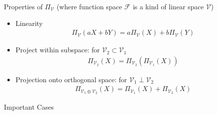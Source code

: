\begin{point}
    Properties of $ \Pi_{\mathcal{V}} $ (where function space $ \mathscr{F} $ is a kind of linear space $ \mathcal{V} $)
\end{point}
\begin{itemize}[topsep=2pt,itemsep=0pt]
    \item Linearity
    \begin{align*}
        \Pi_{\mathcal{V}}(aX+bY)=a\Pi_{\mathcal{V}}(X)+b\Pi_{\mathcal{V}}(Y)
    \end{align*}
    \item Project within subspace: for $\mathcal{V}_2\subset \mathcal{V}_1 $
    \begin{align*}
        \Pi_{\mathcal{V}_2}(X)=\Pi_{\mathcal{V}_2}\left(\Pi_{\mathcal{V}_1}(X)\right) 
    \end{align*}
    \item Projection onto orthogonal space: for $ \mathcal{V}_1\perp\mathcal{V}_2 $
    \begin{align*}
        \Pi_{\mathcal{V}_1\oplus\mathcal{V}_2}(X)=\Pi_{\mathcal{V}_1}(X)+\Pi_{\mathcal{V}_2}(X) 
    \end{align*}
\end{itemize}

\begin{point}
    Important Cases
\end{point}

